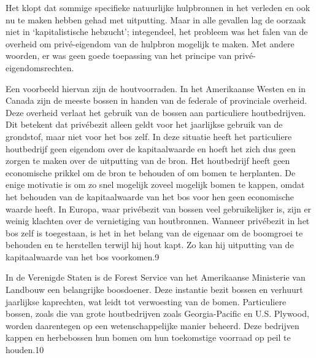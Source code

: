 \documentclass[
  a5paper,
  smalldemyvopaper,10pt,twoside,onecolumn,openright,extrafontsizes,hidelinks]{memoir}
\begin{document}
Het klopt dat sommige specifieke natuurlijke hulpbronnen in het verleden
en ook nu te maken hebben gehad met uitputting. Maar in alle gevallen
lag de oorzaak niet in `kapitalistische hebzucht'; integendeel, het
probleem was het falen van de overheid om privé-eigendom van de hulpbron
mogelijk te maken. Met andere woorden, er was geen goede toepassing van
het principe van privé-eigendomsrechten.

Een voorbeeld hiervan zijn de houtvoorraden. In het Amerikaanse Westen
en in Canada zijn de meeste bossen in handen van de federale of
provinciale overheid. Deze overheid verlaat het gebruik van de bossen
aan particuliere houtbedrijven. Dit betekent dat privébezit alleen geldt
voor het jaarlijkse gebruik van de grondstof, maar niet voor het bos
zelf. In deze situatie heeft het particuliere houtbedrijf geen eigendom
over de kapitaalwaarde en hoeft het zich dus geen zorgen te maken over
de uitputting van de bron. Het houtbedrijf heeft geen economische
prikkel om de bron te behouden of om bomen te herplanten. De enige
motivatie is om zo snel mogelijk zoveel mogelijk bomen te kappen, omdat
het behouden van de kapitaalwaarde van het bos voor hen geen economische
waarde heeft. In Europa, waar privébezit van bossen veel gebruikelijker
is, zijn er weinig klachten over de vernietiging van houtbronnen.
Wanneer privébezit in het bos zelf is toegestaan, is het in het belang
van de eigenaar om de boomgroei te behouden en te herstellen terwijl hij
hout kapt. Zo kan hij uitputting van de kapitaalwaarde van het bos
voorkomen.9

In de Verenigde Staten is de Forest Service van het Amerikaanse
Ministerie van Landbouw een belangrijke boosdoener. Deze instantie bezit
bossen en verhuurt jaarlijkse kaprechten, wat leidt tot verwoesting van
de bomen. Particuliere bossen, zoals die van grote houtbedrijven zoals
Georgia-Pacific en U.S. Plywood, worden daarentegen op een
wetenschappelijke manier beheerd. Deze bedrijven kappen en herbebossen
hun bomen om hun toekomstige voorraad op peil te houden.10
\end{document}
